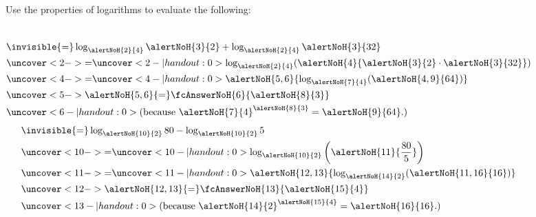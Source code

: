\begin{frame}
\begin{example}
Use the properties of logarithms to evaluate the following:
\begin{columns}[t]
\begin{align*}
& \invisible{=} \log_{\alertNoH{2}{4}} \alertNoH{3}{2} + \log_{\alertNoH{2}{4}} \alertNoH{3}{32} \\
&\uncover<2->{=}  \uncover<2-| handout:0>{ \log_{ \alertNoH{2}{4}} (\alertNoH{4}{ \alertNoH{3}{2}\cdot \alertNoH{3}{32}} )} \\
&\uncover<4->{=}  \uncover<4-| handout:0>{ \alertNoH{5,6}{ \log_{ \alertNoH{7}{4}} (\alertNoH{4,9}{64})}} \\
&\uncover<5->{\alertNoH{5,6}{=}}  \fcAnswerNoH{6}{\alertNoH{8}{3}} \\
& \uncover<6-| handout:0>{\text{(because ${\alertNoH{7}{4}}^{\alertNoH{8}{3}} = \alertNoH{9}{64}$.)}}
\end{align*}
\begin{align*}
& \invisible{=} \log_{\alertNoH{10}{2}} 80 - \log_{ \alertNoH{10}{2} } 5 \\
&\uncover<10->{=}  \uncover<10-| handout:0>{ \log_{\alertNoH{10}{2}} \left(\alertNoH{11}{ \frac{80}{5}} \right) } \\
&\uncover<11->{=}  \uncover<11-| handout:0>{\alertNoH{12,13 }{ \log_{\alertNoH{14}{2}} (\alertNoH{11,16}{16})}} \\
&\uncover<12->{\alertNoH{12,13}{=}}  \fcAnswerNoH{13}{\alertNoH{15}{4}} \\
& \uncover<13-| handout:0>{\text{(because $\alertNoH{14}{2}^{\alertNoH{15}{4}} = \alertNoH{16}{16}$.)}}
\end{align*}
\end{columns}
\end{example}
\end{frame}
